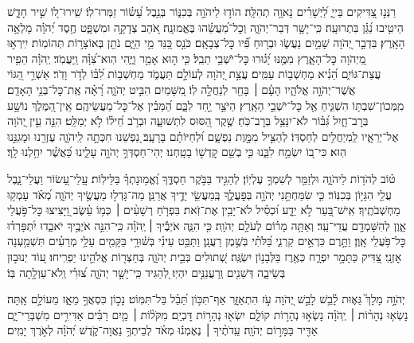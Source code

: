 \documentclass[twoside, openany, parskip=half, 11pt]{book}
\begin{document}
\begin{narrow}
רַנְּנ֣וּ צַ֭דִּיקִים בַּייָ֑
לַ֝יְשָׁרִ֗ים נָאוָ֥ה תְהִלָּֽה׃
הוֹד֣וּ לַיהֹוָ֣ה בְּכִנּ֑וֹר בְּנֵ֥בֶל עָ֝שׂ֗וֹר זַמְּרוּ־לֽוֹ׃
שִֽׁירוּ־ל֭וֹ שִׁ֣יר חָדָ֑שׁ הֵיטִ֥יבוּ נַ֝גֵּ֗ן בִּתְרוּעָֽה׃
כִּֽי־יָשָׁ֥ר דְּבַר־יְהֹוָ֑ה וְכׇל־מַ֝עֲשֵׂ֗הוּ בֶּאֱמוּנָֽה׃
אֹ֭הֵב צְדָקָ֣ה וּמִשְׁפָּ֑ט חֶ֥סֶד יְ֝הֹוָ֗ה מָלְאָ֥ה הָאָֽרֶץ׃
בִּדְבַ֣ר יְ֭הֹוָה שָׁמַ֣יִם נַעֲשׂ֑וּ וּבְר֥וּחַ פִּ֗֝יו כׇּל־צְבָאָֽם׃
כֹּנֵ֣ס כַּ֭נֵּד מֵ֣י הַיָּ֑ם נֹתֵ֖ן בְּאוֹצָר֣וֹת תְּהוֹמֽוֹת׃
יִֽירְא֣וּ מֵ֭יְהֹוָה כׇּל־הָאָ֑רֶץ מִמֶּ֥נּוּ יָ֝ג֗וּרוּ כׇּל־יֹשְׁבֵ֥י תֵבֵֽל׃
כִּ֤י ה֣וּא אָמַ֣ר וַיֶּ֑הִי הֽוּא־צִ֝וָּ֗ה וַֽיַּעֲמֹֽד׃
יְֽהֹוָ֗ה הֵפִ֥יר עֲצַת־גּוֹיִ֑ם הֵ֝נִ֗יא מַחְשְׁב֥וֹת עַמִּֽים׃
עֲצַ֣ת יְ֭הֹוָה לְעוֹלָ֣ם תַּעֲמֹ֑ד מַחְשְׁב֥וֹת לִ֝בּ֗וֹ לְדֹ֣ר וָדֹֽר׃
אַשְׁרֵ֣י הַ֭גּוֹי אֲשֶׁר־יְהֹוָ֣ה אֱלֹהָ֑יו הָעָ֓ם ׀ בָּחַ֖ר לְנַחֲלָ֣ה לֽוֹ׃
מִ֭שָּׁמַיִם הִבִּ֣יט יְהֹוָ֑ה רָ֝אָ֗ה אֶֽת־כׇּל־בְּנֵ֥י הָאָדָֽם׃
מִֽמְּכוֹן־שִׁבְתּ֥וֹ הִשְׁגִּ֑יחַ אֶ֖ל כׇּל־יֹשְׁבֵ֣י הָאָֽרֶץ׃
הַיֹּצֵ֣ר יַ֣חַד לִבָּ֑ם הַ֝מֵּבִ֗ין אֶל־כׇּל־מַעֲשֵׂיהֶֽם׃
אֵֽין־הַ֭מֶּלֶךְ נוֹשָׁ֣ע בְּרׇב־חָ֑יִל גִּ֝בּ֗וֹר לֹא־יִנָּצֵ֥ל בְּרׇב־כֹּֽחַ׃
שֶׁ֣קֶר הַ֭סּוּס לִתְשׁוּעָ֑ה וּבְרֹ֥ב חֵ֝יל֗וֹ לֹ֣א יְמַלֵּֽט׃
הִנֵּ֤ה עֵ֣ין יְ֭הֹוָה אֶל־יְרֵאָ֑יו לַֽמְיַחֲלִ֥ים לְחַסְדּֽוֹ׃
לְהַצִּ֣יל מִמָּ֣וֶת נַפְשָׁ֑ם וּ֝לְחַיּוֹתָ֗ם בָּרָעָֽב׃
נַ֭פְשֵׁנוּ חִכְּתָ֣ה לַֽיהֹוָ֑ה עֶזְרֵ֖נוּ וּמָגִנֵּ֣נוּ הֽוּא׃
כִּי־ב֭וֹ יִשְׂמַ֣ח לִבֵּ֑נוּ כִּ֤י בְשֵׁ֖ם קׇדְשׁ֣וֹ בָטָֽחְנוּ׃
יְהִי־חַסְדְּךָ֣ יְהֹוָ֣ה עָלֵ֑ינוּ כַּ֝אֲשֶׁ֗ר יִחַ֥לְנוּ לָֽךְ׃ 
\end{narrow}
\newcommand{\mizmorshabbat}{
\firstword{מִזְמ֥וֹר שִׁ֗יר לְי֣וֹם הַשַּׁבָּֽת׃}\source{תהלים צב}
ט֗וֹב לְהֹד֥וֹת לַיהֹוָ֑ה וּלְזַמֵּ֖ר לְשִׁמְךָ֣ עֶלְיֽוֹן׃
לְהַגִּ֣יד בַּבֹּ֣קֶר חַסְדֶּ֑ךָ וֶ֝אֱמ֥וּנָתְךָ֗ בַּלֵּילֽוֹת׃
עֲֽלֵי־עָ֭שׂוֹר וַעֲלֵי־נָ֑בֶל עֲלֵ֖י הִגָּי֣וֹן בְּכִנּֽוֹר׃
כִּ֤י שִׂמַּחְתַּ֣נִי יְהֹוָ֣ה בְּפׇעֳלֶ֑ךָ בְּֽמַעֲשֵׂ֖י יָדֶ֣יךָ אֲרַנֵּֽן׃
מַה־גָּדְל֣וּ מַעֲשֶׂ֣יךָ יְהֹוָ֑ה מְ֝אֹ֗ד עָמְק֥וּ מַחְשְׁבֹתֶֽיךָ׃
אִֽישׁ־בַּ֭עַר לֹ֣א יֵדָ֑ע וּ֝כְסִ֗יל לֹא־יָבִ֥ין אֶת־זֹֽאת׃
בִּפְרֹ֤חַ רְשָׁעִ֨ים ׀ כְּמ֥וֹ עֵ֗שֶׂב וַ֭יָּצִיצוּ כׇּל־פֹּ֣עֲלֵי אָ֑וֶן לְהִשָּׁמְדָ֥ם עֲדֵי־עַֽד׃
וְאַתָּ֥ה מָר֗וֹם לְעֹלָ֥ם יְהֹוָֽה׃
כִּ֤י הִנֵּ֪ה אֹיְבֶ֡יךָ ׀ יְֽהֹוָ֗ה כִּֽי־הִנֵּ֣ה אֹיְבֶ֣יךָ יֹאבֵ֑דוּ יִ֝תְפָּרְד֗וּ כׇּל־פֹּ֥עֲלֵי אָֽוֶן׃
וַתָּ֣רֶם כִּרְאֵ֣ים קַרְנִ֑י בַּ֝לֹּתִ֗י בְּשֶׁ֣מֶן רַעֲנָֽן׃
וַתַּבֵּ֥ט עֵינִ֗י בְּשׁ֫וּרָ֥י בַּקָּמִ֖ים עָלַ֥י מְרֵעִ֗ים תִּשְׁמַ֥עְנָה אׇזְנָֽי׃
צַ֭דִּיק כַּתָּמָ֣ר יִפְרָ֑ח כְּאֶ֖רֶז בַּלְּבָנ֣וֹן יִשְׂגֶּֽה׃
שְׁ֭תוּלִים בְּבֵ֣ית יְהֹוָ֑ה בְּחַצְר֖וֹת אֱלֹהֵ֣ינוּ יַפְרִֽיחוּ׃
ע֭וֹד יְנוּב֣וּן בְּשֵׂיבָ֑ה דְּשֵׁנִ֖ים וְֽרַעֲנַנִּ֣ים יִהְיֽוּ׃
לְ֭הַגִּיד כִּֽי־יָשָׁ֣ר יְהֹוָ֑ה צ֝וּרִ֗י וְֽלֹא־עַוְלָ֥תָה בּֽוֹ׃ 
}
\begin{narrow}
	\mizmorshabbat

יְהֹוָ֣ה מָלָךְ֮ גֵּא֢וּת לָ֫בֵ֥שׁ
לָבֵ֣שׁ יְ֭הֹוָה עֹ֣ז הִתְאַזָּ֑ר אַף־תִּכּ֥וֹן תֵּ֝בֵ֗ל בַּל־תִּמּֽוֹט׃
נָכ֣וֹן כִּסְאֲךָ֣ מֵאָ֑ז מֵעוֹלָ֣ם אָֽתָּה׃
נָשְׂא֤וּ נְהָר֨וֹת ׀ יְֽהֹוָ֗ה נָשְׂא֣וּ נְהָר֣וֹת קוֹלָ֑ם יִשְׂא֖וּ נְהָר֣וֹת דׇּכְיָֽם׃
מִקֹּל֨וֹת ׀ מַ֤יִם רַבִּ֗ים אַדִּירִ֣ים מִשְׁבְּרֵי־יָ֑ם אַדִּ֖יר בַּמָּר֣וֹם יְהֹוָֽה׃
עֵֽדֹתֶ֨יךָ ׀ נֶאֶמְנ֬וּ מְאֹ֗ד לְבֵיתְךָ֥ נַאֲוָה־קֹ֑דֶשׁ יְ֝הֹוָ֗ה לְאֹ֣רֶךְ יָמִֽים׃

\end{narrow}
\end{document}
